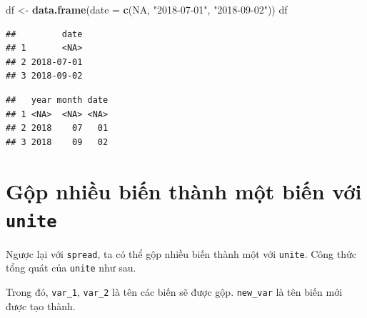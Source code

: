 \documentclass[]{krantz}
\makeatletter
\newenvironment{Shaded}{\begin{snugshade}}{\end{snugshade}}
\newcommand{\CommentTok}[1]{\textcolor[rgb]{0.37,0.37,0.37}{\textit{#1}}}
\newcommand{\DataTypeTok}[1]{\textcolor[rgb]{0.27,0.27,0.27}{#1}}
\newcommand{\DecValTok}[1]{\textcolor[rgb]{0.06,0.06,0.06}{#1}}
\newcommand{\KeywordTok}[1]{\textcolor[rgb]{0.27,0.27,0.27}{\textbf{#1}}}
\newcommand{\NormalTok}[1]{#1}
\newcommand{\OperatorTok}[1]{\textcolor[rgb]{0.43,0.43,0.43}{\textbf{#1}}}
\newcommand{\OtherTok}[1]{\textcolor[rgb]{0.37,0.37,0.37}{#1}}
\newcommand{\StringTok}[1]{\textcolor[rgb]{0.5,0.5,0.5}{#1}}
\newenvironment{kframe}{%
\medskip{}
\setlength{\fboxsep}{.8em}
 \def\at@end@of@kframe{}%
 \ifinner\ifhmode%
  \def\at@end@of@kframe{\end{minipage}}%
  \begin{minipage}{\columnwidth}%
 \fi\fi%
 \def\FrameCommand##1{\hskip\@totalleftmargin \hskip-\fboxsep
 \colorbox{shadecolor}{##1}\hskip-\fboxsep
     \hskip-\linewidth \hskip-\@totalleftmargin \hskip\columnwidth}%
 \MakeFramed {\advance\hsize-\width
   \@totalleftmargin\z@ \linewidth\hsize
   \@setminipage}}%
 {\par\unskip\endMakeFramed%
 \at@end@of@kframe}
\renewenvironment{Shaded}{\begin{kframe}}{\end{kframe}}
\renewenvironment{Shaded}{\begin{snugshade}}{\end{snugshade}}
\renewcommand{\CommentTok}[1]{\textcolor[rgb]{0.56,0.35,0.01}{\textit{#1}}}
\renewcommand{\DataTypeTok}[1]{\textcolor[rgb]{0.13,0.29,0.53}{#1}}
\renewcommand{\DecValTok}[1]{\textcolor[rgb]{0.00,0.00,0.81}{#1}}
\renewcommand{\KeywordTok}[1]{\textcolor[rgb]{0.13,0.29,0.53}{\textbf{#1}}}
\renewcommand{\NormalTok}[1]{#1}
\renewcommand{\OperatorTok}[1]{\textcolor[rgb]{0.81,0.36,0.00}{\textbf{#1}}}
\renewcommand{\OtherTok}[1]{\textcolor[rgb]{0.56,0.35,0.01}{#1}}
\renewcommand{\StringTok}[1]{\textcolor[rgb]{0.31,0.60,0.02}{#1}}
\theoremstyle{definition}
\theoremstyle{definition}
\theoremstyle{definition}
\theoremstyle{remark}
\makeatother
\begin{document}
\begin{Shaded}
\begin{Highlighting}[]
\NormalTok{df <-}\StringTok{ }\KeywordTok{data.frame}\NormalTok{(}\DataTypeTok{date =} \KeywordTok{c}\NormalTok{(}\OtherTok{NA}\NormalTok{, }
                          \StringTok{"2018-07-01"}\NormalTok{, }
                          \StringTok{"2018-09-02"}\NormalTok{))}
\NormalTok{df}
\end{Highlighting}
\end{Shaded}

\begin{verbatim}
##         date
## 1       <NA>
## 2 2018-07-01
## 3 2018-09-02
\end{verbatim}

\begin{Shaded}
\end{Shaded}

\begin{verbatim}
##   year month date
## 1 <NA>  <NA> <NA>
## 2 2018    07   01
## 3 2018    09   02
\end{verbatim}

\hypertarget{gp-nhiu-bin-thanh-mt-bin-vi-unite}{%
\section{\texorpdfstring{Gộp nhiều biến thành một biến với
\texttt{unite}}{Gộp nhiều biến thành một biến với unite}}\label{gp-nhiu-bin-thanh-mt-bin-vi-unite}}

Ngược lại với \texttt{spread}, ta có thể gộp nhiều biến thành một với
\texttt{unite}. Công thức tổng quát của \texttt{unite} như sau.

\begin{Shaded}
\end{Shaded}

Trong đó, \texttt{var\_1}, \texttt{var\_2} là tên các biến sẽ được gộp.
\texttt{new\_var} là tên biến mới được tạo thành.
\end{document}
